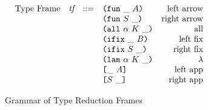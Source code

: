 \documentclass[../plutus-core-specification.tex]{subfiles}
\begin{document}

\newcommand\tf{\textit{tf}}  %


\begin{figure}[H]

\begin{subfigure}[c]{\linewidth}
    \[\begin{array}{lrclr}
        \textrm{Type Frame} &\tf & ::= %
                                       & \inFunTLeftFrame{A}                        & \textrm{left arrow}\\
                            &    &     & \inFunTRightFrame{S}                       & \textrm{right arrow}\\
                            &    &     & \inAllTFrame{\alpha}{K}                    & \textrm{all}\\
                            &	 &     & \inFixTLeftFrame{B}                        & \textrm{left fix}\\
                            &    &     & \inFixTRightFrame{S}                       & \textrm{right fix}\\
                            &    &     & \inLamTFrame{\alpha}{K}                    & \textrm{$\lambda$}\\
                            &    &     & \inAppTLeftFrame{A}                        & \textrm{left app}\\
                            &    &     & \inAppTRightFrame{S}                       & \textrm{right app}\\
    \end{array}\]

    \caption{Grammar of Type Reduction Frames}
    \label{fig:type-reduction-frames}
\end{subfigure}




\begin{subfigure}[c]{\linewidth}


\end{subfigure}
\end{figure}
\end{document}
